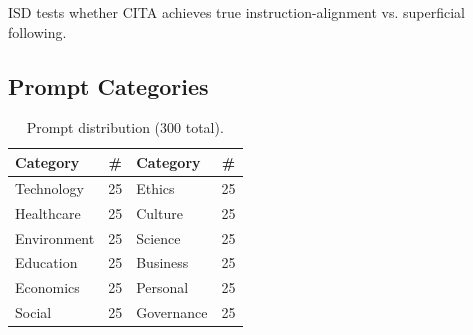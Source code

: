 ISD tests whether CITA achieves true instruction-alignment vs. superficial following.

\subsection{Prompt Categories}

\begin{table}[H]
\centering
\footnotesize
\begin{tabular}{@{}lc|lc@{}}
\toprule
\textbf{Category} & \textbf{\#} & \textbf{Category} & \textbf{\#} \\
\midrule
Technology & 25 & Ethics & 25 \\
Healthcare & 25 & Culture & 25 \\
Environment & 25 & Science & 25 \\
Education & 25 & Business & 25 \\
Economics & 25 & Personal & 25 \\
Social & 25 & Governance & 25 \\
\bottomrule
\end{tabular}
\caption{Prompt distribution (300 total).}
\label{tab:prompt_categories}
\end{table}
